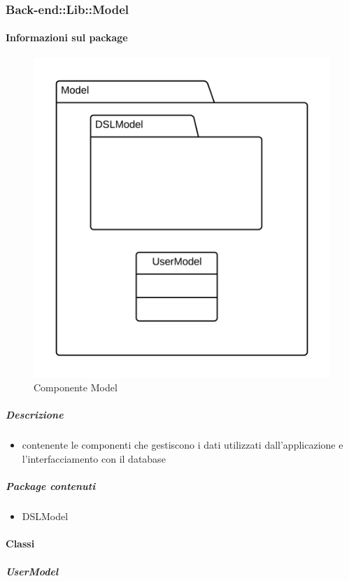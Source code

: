 	\subsubsection{Back-end::Lib::Model}
	\paragraph{Informazioni sul package} 
		\begin{figure}[H] 
			\begin{center} 
				\includegraphics[width=\textwidth]{uml/package/Back-end::Lib::Model.png}  
				\caption{Componente Model}
			\end{center}  
		\end{figure} 
	\subparagraph{Descrizione} 
		\begin{itemize}
		\item[]  contenente le componenti che gestiscono i dati utilizzati dall’applicazione e l’interfacciamento con il
database
		\end{itemize} 
		\subparagraph{Package contenuti} 
		\begin{itemize}
				\item DSLModel
		\end{itemize}
		\paragraph{Classi}
			\subparagraph{UserModel}
				
